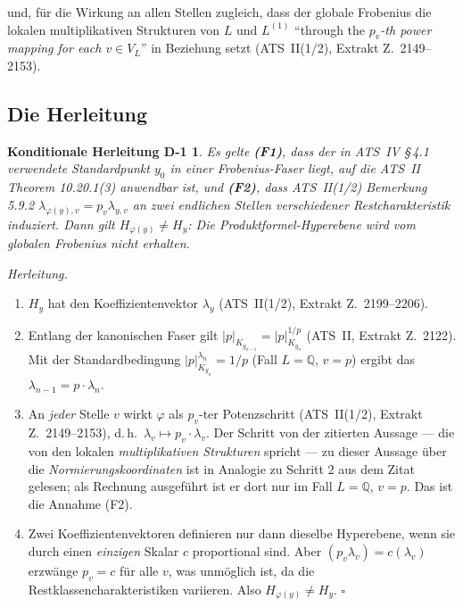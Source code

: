 \documentclass[11pt,a4paper]{article}
\theoremstyle{definition}
\theoremstyle{plain}
\newtheorem*{derivationD}{Konditionale Herleitung D-1}
\theoremstyle{definition}
\newcommand{\anchor}[2]{(#1, Extrakt Z.~#2)}
\begin{document}
und, für die Wirkung an allen Stellen zugleich, dass der globale Frobenius die
lokalen multiplikativen Strukturen von $L$ und $L^{(1)}$ ``through the \emph{$p_v$-th
power mapping for each $v \in V_L$}'' in Beziehung setzt
\anchor{ATS~II(1/2)}{2149--2153}.

\subsection{Die Herleitung}

\begin{derivationD}
Es gelte \textbf{(F1)}, dass der in ATS~IV \S\,4.1 verwendete Standardpunkt $y_0$
in einer Frobenius-Faser liegt, auf die ATS~II Theorem 10.20.1(3) anwendbar ist,
und \textbf{(F2)}, dass ATS~II(1/2) Bemerkung 5.9.2
$\lambda_{\varphi(y),v} = p_v \lambda_{y,v}$ an zwei endlichen Stellen
verschiedener Restcharakteristik induziert. Dann gilt
$H_{\varphi(y)} \neq H_y$: Die Produktformel-Hyperebene wird vom globalen Frobenius
nicht erhalten.
\end{derivationD}

\noindent\emph{Herleitung.}
\begin{enumerate}
\item $H_y$ hat den Koeffizientenvektor $\lambda_y$
  \anchor{ATS~II(1/2)}{2199--2206}.
\item Entlang der kanonischen Faser gilt
  $|p|_{K_{y_{n-1}}} = |p|^{1/p}_{K_{y_n}}$ \anchor{ATS~II}{2122}. Mit der
  Standardbedingung $|p|^{\lambda_n}_{K_{y_n}} = 1/p$ (Fall $L = \mathbb{Q}$,
  $v = p$) ergibt das $\lambda_{n-1} = p \cdot \lambda_n$.
\item An \emph{jeder} Stelle $v$ wirkt $\varphi$ als $p_v$-ter Potenzschritt
  \anchor{ATS~II(1/2)}{2149--2153}, d.\,h.\ $\lambda_v \mapsto p_v \cdot \lambda_v$.
  Der Schritt von der zitierten Aussage --- die von den lokalen
  \emph{multiplikativen Strukturen} spricht --- zu dieser Aussage über die
  \emph{Normierungskoordinaten} ist in Analogie zu Schritt 2 aus dem Zitat gelesen;
  als Rechnung ausgeführt ist er dort nur im Fall $L = \mathbb{Q}$, $v = p$. Das
  ist die Annahme (F2).
\item Zwei Koeffizientenvektoren definieren nur dann dieselbe Hyperebene, wenn sie
  durch einen \emph{einzigen} Skalar $c$ proportional sind. Aber
  $(p_v \lambda_v) = c(\lambda_v)$ erzwänge $p_v = c$ für alle $v$, was unmöglich
  ist, da die Restklassencharakteristiken variieren. Also
  $H_{\varphi(y)} \neq H_y$. \hfill$\square$
\end{enumerate}
\end{document}
